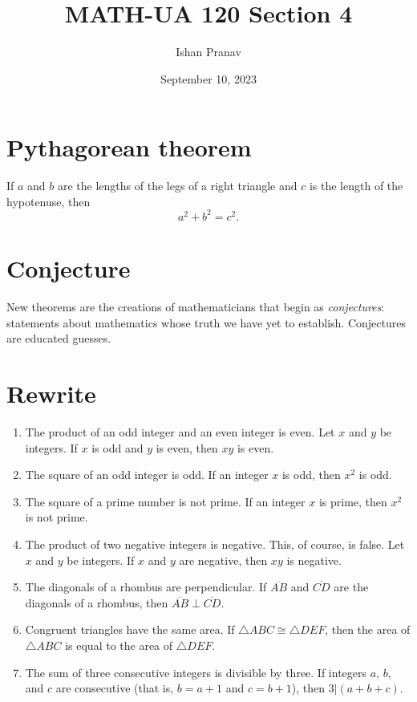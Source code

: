 \documentclass[12pt]{article}
\title{MATH-UA 120 Section 4}
\author{Ishan Pranav}
\date{September 10, 2023}
\begin{document}
\maketitle
\section*{Pythagorean theorem}
If $a$ and $b$ are the lengths of the legs of a right triangle and $c$ is the length of the hypotenuse, then
\[a^2+b^2=c^2.\]
\section*{Conjecture}
New theorems are the creations of mathematicians that begin as \textit{conjectures}: statements about mathematics whose truth we have yet to establish. Conjectures are educated guesses.
\section{Rewrite}
\begin{enumerate}
    \item The product of an odd integer and an even integer is even. Let $x$ and $y$ be integers. If $x$ is odd and $y$ is even, then $xy$ is even.
    \item The square of an odd integer is odd. If an integer $x$ is odd, then $x^2$ is odd.
    \item The square of a prime number is not prime. If an integer $x$ is prime, then $x^2$ is not prime.
    \item The product of two negative integers is negative. This, of course, is false. Let $x$ and $y$ be integers. If $x$ and $y$ are negative, then $xy$ is negative.
    \item The diagonals of a rhombus are perpendicular. If $\overline{AB}$ and $\overline{CD}$ are the diagonals of a rhombus, then $\overline{AB}\perp\overline{CD}$.
    \item Congruent triangles have the same area. If $\triangle ABC\cong\triangle DEF$, then the area of $\triangle ABC$ is equal to the area of $\triangle DEF$.
    \item The sum of three consecutive integers is divisible by three. If integers $a$, $b$, and $c$ are consecutive (that is, $b=a+1$ and $c=b+1$), then $3|(a+b+c)$.
\end{enumerate}
\end{document}
